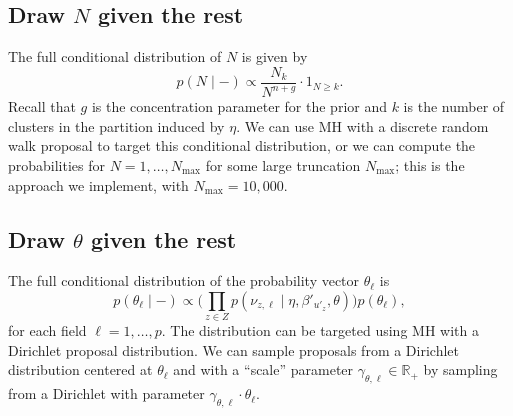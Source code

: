 \documentclass[ba]{imsart}
\begin{document}
\subsection{Draw $N$ given the rest}

The full conditional distribution of $N$ is given by 
\begin{equation}
    \label{eq:N_conditional}
    p(N \mid - ) \propto \frac{N_k}{N^{n +g}}\cdot 1_{N \geq k}.
\end{equation} 
Recall that $g$ is the concentration parameter for the prior and $k$ is the number of clusters in the partition induced by $\eta.$ We can use MH with a discrete random walk proposal to target this conditional distribution, or we can compute the 
probabilities for $N=1,\ldots,N_{\max}$
for some large truncation $N_{\max}$; this is the approach
we implement, with $N_{\max} = 10,000$.




\subsection{Draw $\theta$ given the rest}

The full conditional distribution of the probability vector $\theta_\ell$ is 
\begin{equation}
    \label{eq:theta_conditional}
    p(\theta_\ell \mid - ) \propto \Big( \prod_{z \in Z} p(\nu_{z,\ell} \mid \eta, \beta'_{u'_z},\theta)\Big)  p(\theta_\ell),
\end{equation}
for each field $\ell = 1,\ldots, p$. The distribution
can be targeted using MH with a Dirichlet proposal distribution.
We can sample proposals from a Dirichlet distribution centered
at $\theta_\ell$ and with a ``scale'' parameter $\gamma_{\theta,\ell}\in \mathbb{R}_+$ by sampling
from a Dirichlet with parameter $\gamma_{\theta,\ell}\cdot \theta_\ell$.
\end{document}
